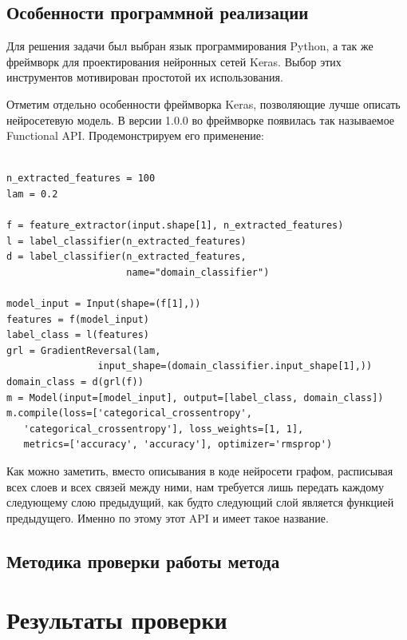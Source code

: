 \documentclass[14pt]{extarticle}
\begin{document}
\subsection{Особенности программной реализации}
Для решения задачи был выбран язык программирования Python, а так же фреймворк для проектирования нейронных сетей Keras. Выбор этих инструментов мотивирован простотой их использования.

Отметим отдельно особенности фреймворка Keras, позволяющие лучше описать нейросетевую модель. В версии 1.0.0 во фреймворке появилась так называемое Functional API. Продемонстрируем его применение:

\begin{verbatim}

n_extracted_features = 100
lam = 0.2

f = feature_extractor(input.shape[1], n_extracted_features)
l = label_classifier(n_extracted_features)
d = label_classifier(n_extracted_features,
                     name="domain_classifier")
	                     
model_input = Input(shape=(f[1],))
features = f(model_input)
label_class = l(features)
grl = GradientReversal(lam, 
                input_shape=(domain_classifier.input_shape[1],))
domain_class = d(grl(f))
m = Model(input=[model_input], output=[label_class, domain_class])
m.compile(loss=['categorical_crossentropy',
   'categorical_crossentropy'], loss_weights=[1, 1],
   metrics=['accuracy', 'accuracy'], optimizer='rmsprop') 
\end{verbatim}

Как можно заметить, вместо описывания в коде нейросети графом, расписывая всех слоев и всех связей между ними, нам требуется лишь передать каждому следующему слою предыдущий, как будто следующий слой является функцией предыдущего. Именно по этому этот API и имеет такое название.

\subsection{Методика проверки работы метода}



\newpage
\section{Результаты проверки}
\end{document}
